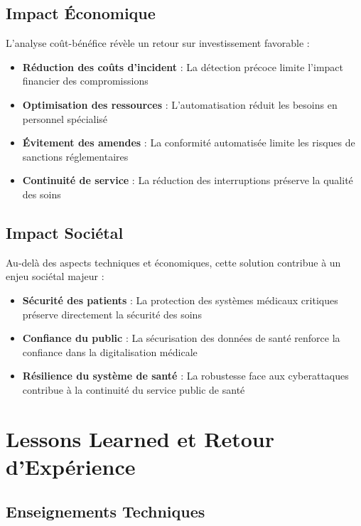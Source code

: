 \subsection{Impact Économique}

L'analyse coût-bénéfice révèle un retour sur investissement favorable :

\begin{itemize}
  \item \textbf{Réduction des coûts d'incident} : La détection précoce limite l'impact financier des compromissions
  \item \textbf{Optimisation des ressources} : L'automatisation réduit les besoins en personnel spécialisé
  \item \textbf{Évitement des amendes} : La conformité automatisée limite les risques de sanctions réglementaires
  \item \textbf{Continuité de service} : La réduction des interruptions préserve la qualité des soins
\end{itemize}

\subsection{Impact Sociétal}

Au-delà des aspects techniques et économiques, cette solution contribue à un enjeu sociétal majeur :

\begin{itemize}
  \item \textbf{Sécurité des patients} : La protection des systèmes médicaux critiques préserve directement la sécurité des soins
  \item \textbf{Confiance du public} : La sécurisation des données de santé renforce la confiance dans la digitalisation médicale
  \item \textbf{Résilience du système de santé} : La robustesse face aux cyberattaques contribue à la continuité du service public de santé
\end{itemize}

\section{Lessons Learned et Retour d'Expérience}

\subsection{Enseignements Techniques}

